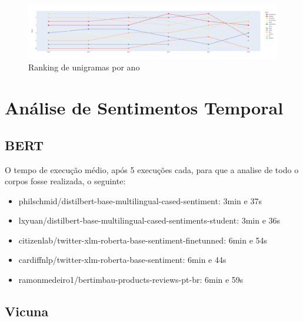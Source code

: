\begin{figure}
	\centering
	\includegraphics[width=.7\textwidth]{figs/exploratoria/ranking_unigramas_por_ano.png}
	\caption{Ranking de unigramas por ano}
	\label{img:rank_unigramas}
\end{figure}

\section{Análise de Sentimentos Temporal}
\label{cap:resultados:sec:analise_sentimento}

\subsection[BERT]{BERT}
\label{sec:resultados:subsec:bert}

O tempo de execução médio, após 5 execuções cada, para que a analise de todo o corpos fosse realizada, o seguinte:

\begin{itemize}
	\item philschmid/distilbert-base-multilingual-cased-sentiment: 3min e 37s
	\item lxyuan/distilbert-base-multilingual-cased-sentiments-student: 3min e 36s
	\item citizenlab/twitter-xlm-roberta-base-sentiment-finetunned: 6min e 54s
	\item cardiffnlp/twitter-xlm-roberta-base-sentiment: 6min e 44s
	\item ramonmedeiro1/bertimbau-products-reviews-pt-br: 6min e 59s
\end{itemize}



\subsection{Vicuna}

